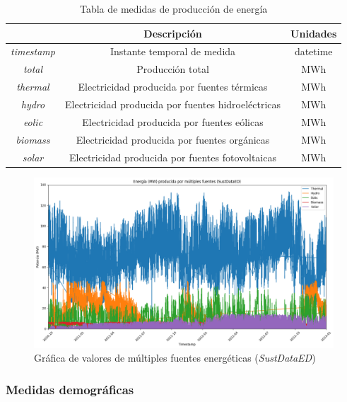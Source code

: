 \begin{table}[h!]
    \centering
    \begin{tabular}{|c|c|c|}
    \hline
    \rowcolor[HTML]{AAAAAA} 
    \multicolumn{1}{|c|}{\cellcolor[HTML]{AAAAAA}Campo} & \multicolumn{1}{c|}{\cellcolor[HTML]{AAAAAA}Descripción} & Unidades \\ \hline
    \textit{timestamp} & Instante temporal de medida & datetime \\ \hline
    \textit{total} & Producción total & MWh \\ \hline
    \textit{thermal} & Electricidad producida por fuentes térmicas & MWh \\ \hline
    \textit{hydro} & Electricidad producida por fuentes hidroeléctricas & MWh \\ \hline
    \textit{eolic} & Electricidad producida por fuentes eólicas & MWh \\ \hline
    \textit{biomass} & Electricidad producida por fuentes orgánicas & MWh \\ \hline
    \textit{solar} & Electricidad producida por fuentes fotovoltaicas & MWh \\ \hline
    \end{tabular}
    \caption{Tabla de medidas de producción de energía \cite{sustdata}}
    \label{tab:prod}
\end{table}

\vspace{3mm}

\begin{figure}[h!]
  \centering
  \includegraphics[width=1\textwidth]{img/diseno/matplotfuentes.png}
  \caption{Gráfica de valores de múltiples fuentes energéticas (\textit{SustDataED})}
  \label{fig:fuentes}
\end{figure}

\subsubsection{Medidas demográficas}
\label{sec:demographic}


